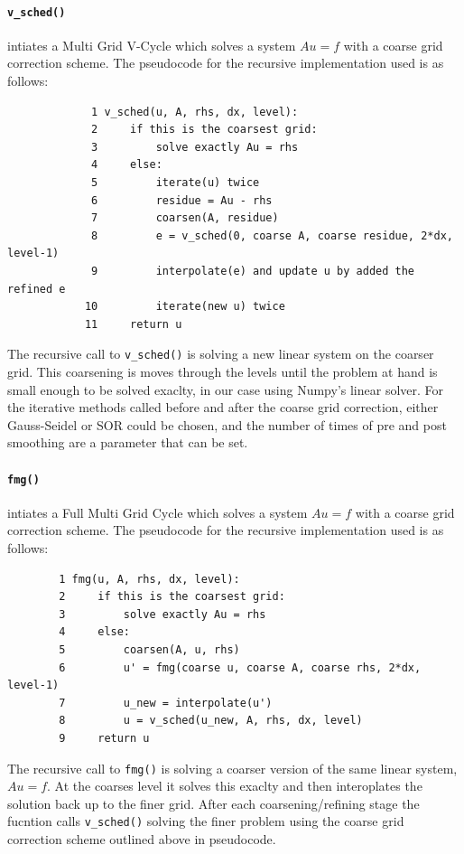 \documentclass[pdftex,12pt,a4paper]{article}
\begin{document}
        \paragraph*{\lstinline{v_sched()}} intiates a Multi Grid V-Cycle which solves a system $Au = f$ with a coarse grid correction scheme. The pseudocode for the recursive implementation used is as follows:
        \begin{verbatim}
             1 v_sched(u, A, rhs, dx, level):
             2     if this is the coarsest grid:
             3         solve exactly Au = rhs
             4     else:
             5         iterate(u) twice
             6         residue = Au - rhs
             7         coarsen(A, residue)
             8         e = v_sched(0, coarse A, coarse residue, 2*dx, level-1)
             9         interpolate(e) and update u by added the refined e
            10         iterate(new u) twice                
            11     return u

        \end{verbatim}
        The recursive call to \lstinline{v_sched()} is solving a new linear system on the coarser grid. This coarsening is moves through the levels until the problem at hand is small enough to be solved exaclty, in our case using Numpy's linear solver. For the iterative methods called before and after the coarse grid correction,  either Gauss-Seidel or SOR could be chosen, and the number of times of pre and post smoothing are a parameter that can be set.

        \paragraph*{\lstinline{fmg()}} intiates a Full Multi Grid Cycle which solves a system $Au = f$ with a coarse grid correction scheme. The pseudocode for the recursive implementation used is as follows:
        \begin{verbatim}
        1 fmg(u, A, rhs, dx, level):
        2     if this is the coarsest grid:
        3         solve exactly Au = rhs
        4     else:
        5         coarsen(A, u, rhs)
        6         u' = fmg(coarse u, coarse A, coarse rhs, 2*dx, level-1)
        7         u_new = interpolate(u')
        8         u = v_sched(u_new, A, rhs, dx, level)
        9     return u

        \end{verbatim}
        The recursive call to \lstinline{fmg()} is solving a coarser version of the same linear system, $Au = f$. At the coarses level it solves this exaclty and then interoplates the solution back up to the finer grid. After each coarsening/refining stage the fucntion calls \lstinline{v_sched()} solving the finer problem using the coarse grid correction scheme outlined above in pseudocode. 
\end{document}
